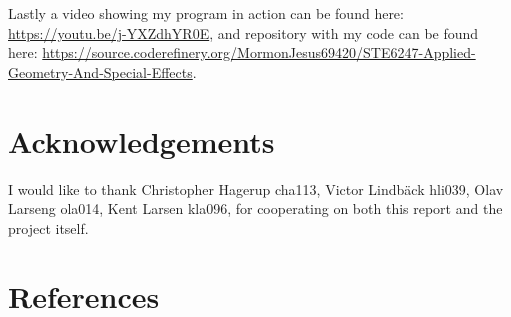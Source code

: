 \documentclass[a4paper,12pt]{extarticle}
\begin{document}
Lastly a video showing my program in action can be found here: \url{https://youtu.be/j-YXZdhYR0E}, and repository with my code can be found here: \url{https://source.coderefinery.org/MormonJesus69420/STE6247-Applied-Geometry-And-Special-Effects}.

\section{Acknowledgements}
I would like to thank Christopher Hagerup cha113, Victor Lindb\"{a}ck hli039, Olav Larseng ola014, Kent Larsen kla096, for cooperating on both this report and the project itself.
 
\section{References}
\begingroup
\def\section*#1{}


\endgroup
\end{document}
